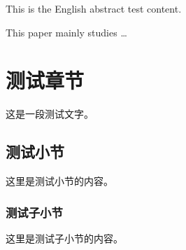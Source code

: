\documentclass{sduthesis}
\begin{document}
\begin{abstract}
这是中文摘要的测试内容。

本文主要研究了\ldots
\end{abstract}

\begin{englishabstract}
This is the English abstract test content.

This paper mainly studies \ldots
\end{englishabstract}

\tableofcontents

\chapter{测试章节}
这是一段测试文字。

\section{测试小节}
这里是测试小节的内容。

\subsection{测试子小节}
这里是测试子小节的内容。
\end{document}
